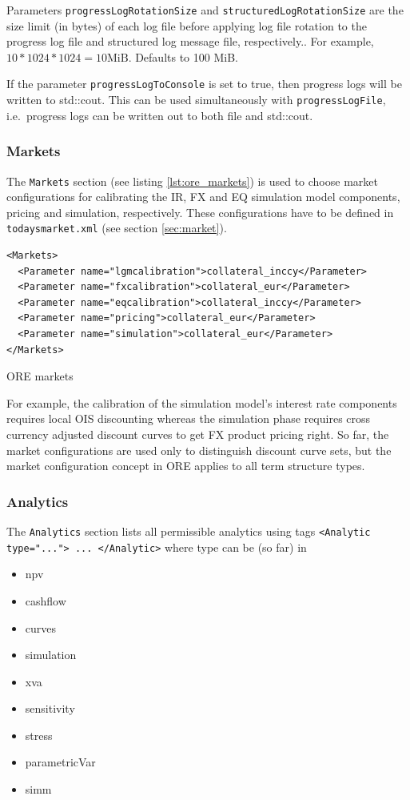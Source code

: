 \documentclass[12pt, a4paper]{article}
\begin{document}
Parameters {\tt progressLogRotationSize} and {\tt structuredLogRotationSize} are the size limit (in bytes)
of each log file before applying log file rotation to the progress log file and structured log message file,
respectively.. For example, $10 * 1024 * 1024 = 10 \text{MiB}$. Defaults to 100 MiB.

If the parameter {\tt progressLogToConsole} is set to true, then progress logs will be written to std::cout.
This can be used simultaneously with {\tt progressLogFile}, i.e.\ progress logs can be written out
to both file and std::cout.

\subsubsection{Markets}\label{sec:master_input_markets}

The {\tt Markets} section (see listing \ref{lst:ore_markets}) is used to choose market configurations for calibrating
the IR, FX and EQ simulation model components, pricing and simulation, respectively. These configurations have to be 
defined
in {\tt todaysmarket.xml} (see section \ref{sec:market}).

\begin{listing}[H]
\begin{verbatim}
<Markets>
  <Parameter name="lgmcalibration">collateral_inccy</Parameter>
  <Parameter name="fxcalibration">collateral_eur</Parameter>
  <Parameter name="eqcalibration">collateral_inccy</Parameter>
  <Parameter name="pricing">collateral_eur</Parameter>
  <Parameter name="simulation">collateral_eur</Parameter>
</Markets>
\end{verbatim}
\caption{ORE markets}
\label{lst:ore_markets}
\end{listing}

For example, the calibration of the simulation model's interest rate components requires local OIS discounting whereas
the simulation phase requires cross currency adjusted discount curves to get FX product pricing right. So far, the
market configurations are used only to distinguish discount curve sets, but the market configuration concept in ORE
applies to all term structure types.

\subsubsection{Analytics}\label{sec:analytics}

The {\tt Analytics} section lists all permissible analytics using tags {\tt <Analytic type="..."> ... </Analytic>} where
type can be (so far) in
\begin{itemize}
\item npv
\item cashflow
\item curves
\item simulation
\item xva
\item sensitivity
\item stress
\item parametricVar
\item simm
\end{itemize}
\end{document}
